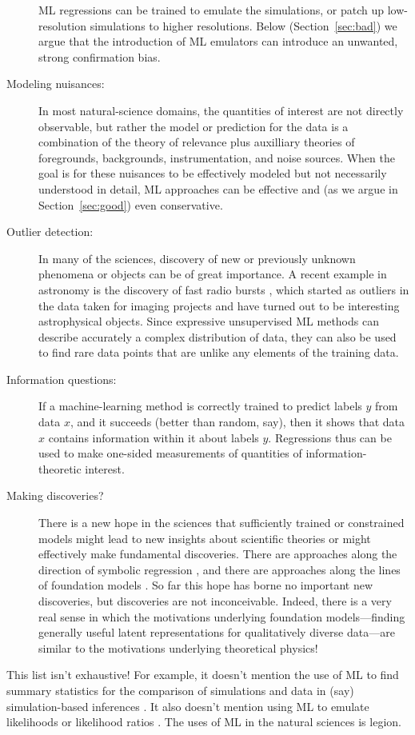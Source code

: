 \documentclass[10pt]{article}
\newcommand{\sectionname}{Section}
\newcommand{\secref}[1]{\sectionname~\ref{#1}}
\begin{document}
\begin{description}
  ML regressions can be trained to emulate the simulations, or patch up low-resolution simulations to higher resolutions.
  Below (\secref{sec:bad}) we argue that the introduction of ML emulators can introduce an unwanted, strong confirmation bias.
  \item[Modeling nuisances:] In most natural-science domains, the quantities of interest are not directly observable, but rather the model or prediction for the data is a combination of the theory of relevance plus auxilliary theories of foregrounds, backgrounds, instrumentation, and noise sources.
  When the goal is for these nuisances to be effectively modeled but not necessarily understood in detail, ML approaches can be effective and (as we argue in \secref{sec:good}) even conservative.
  \item[Outlier detection:] In many of the sciences, discovery of new or previously unknown phenomena or objects can be of great importance.
  A recent example in astronomy is the discovery of fast radio bursts \cite{frbs}, which started as outliers in the data taken for imaging projects and have turned out to be interesting astrophysical objects.
  Since expressive unsupervised ML methods can describe accurately a complex distribution of data, they can also be used to find rare data points that are unlike any elements of the training data.
  \item[Information questions:] If a machine-learning method is correctly trained to predict labels $y$ from data $x$, and it succeeds (better than random, say), then it shows that data $x$ contains information within it about labels $y$.
  Regressions thus can be used to make one-sided measurements of quantities of information-theoretic interest.
  \item[Making discoveries?] There is a new hope in the sciences that sufficiently trained or constrained models might lead to new insights about scientific theories or might effectively make fundamental discoveries.
  There are approaches along the direction of symbolic regression \cite{symbolic1, symbolic2}, and there are approaches along the lines of foundation models \cite{foundation1}.
  So far this hope has borne no important new discoveries, but discoveries are not inconceivable.
  Indeed, there is a very real sense in which the motivations underlying foundation models---finding generally useful latent representations for qualitatively diverse data---are similar to the motivations underlying theoretical physics!
\end{description}
This list isn't exhaustive!
For example, it doesn't mention the use of ML to find summary statistics for the comparison of simulations and data in (say) simulation-based inferences \cite{sbi, simbig}.
It also doesn't mention using ML to emulate likelihoods or likelihood ratios \cite{biwei, likelihood_ratio}.
The uses of ML in the natural sciences is legion.
\end{document}
